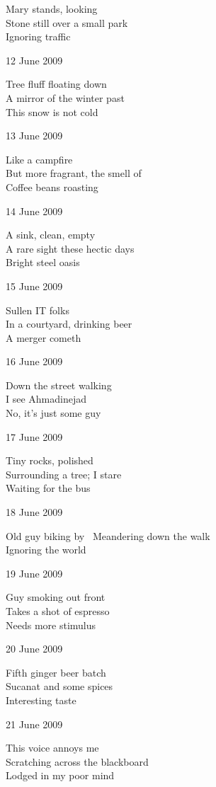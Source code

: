 \documentclass[12pt]{article}
\begin{document}
Mary stands, looking \\
Stone still over a small park \\
Ignoring traffic

12 June 2009

Tree fluff floating down \\
A mirror of the winter past \\
This snow is not cold

13 June 2009

Like a campfire \\
But more fragrant, the smell of \\
Coffee beans roasting

14 June 2009

A sink, clean, empty \\
A rare sight these hectic days \\
Bright steel oasis

15 June 2009

Sullen IT folks \\
In a courtyard, drinking beer \\
A merger cometh

16 June 2009

Down the street walking \\
I see Ahmadinejad \\
No, it's just some guy

\newpage

17 June 2009

Tiny rocks, polished \\
Surrounding a tree; I stare \\
Waiting for the bus

18 June 2009

Old guy biking by \
Meandering down the walk \\
Ignoring the world

19 June 2009

Guy smoking out front \\
Takes a shot of espresso \\
Needs more stimulus

20 June 2009

Fifth ginger beer batch \\
Sucanat and some spices \\
Interesting taste

21 June 2009

This voice annoys me \\
Scratching across the blackboard \\
Lodged in my poor mind
\end{document}
